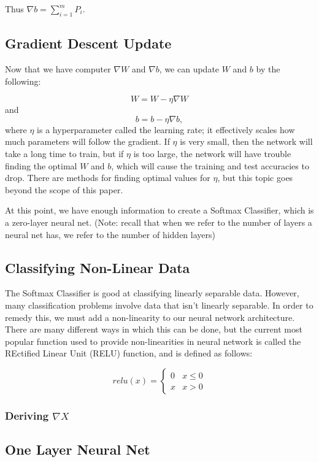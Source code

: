 Thus $\nabla b = \sum_{i=1}^m P_i$.

\subsection{Gradient Descent Update}
Now that we have computer $\nabla W$ and $\nabla b$, we can update $W$
and $b$ by the following:

$$ W = W - \eta \nabla W $$
and
$$ b = b - \eta \nabla b, $$
where $\eta$ is a hyperparameter called the learning rate; it effectively
scales how much parameters will follow the gradient. If $\eta$ is very small,
then the network will take a long time to train, but if $\eta$ is too large,
the network will have trouble finding the optimal $W$ and $b$, which will cause
the training and test accuracies to drop. There are methods for finding optimal
values for $\eta$, but this topic goes beyond the scope of this paper.

At this point, we have enough information to create a Softmax Classifier, which is a
zero-layer neural net. (Note: recall that when we refer to the number of layers
a neural net has, we refer to the number of hidden layers)

\subsection{Classifying Non-Linear Data}
The Softmax Classifier is good at classifying linearly separable data. However,
many classification problems involve data that isn't linearly separable. In
order to remedy this, we must add a non-linearity to our neural network
architecture. There are many different ways in which this can be done, but the
current most popular function used to provide non-linearities in neural network
is called the REctified Linear Unit (RELU) function, and is defined as follows:

\[ relu(x) = \begin{cases} 
      0 & x\leq 0 \\
      x & x > 0 
   \end{cases}
\]

\subsubsection{Deriving $\nabla X$}

\subsection{One Layer Neural Net}
